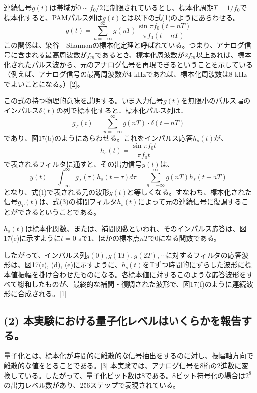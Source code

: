 \documentclass[
  a4paper,
  11pt,
]{ltjsarticle}
\begin{document}
連続信号$g(t)$は帯域が$0 \sim f_0/2$に制限されているとし、標本化周期$T = 1/f_0$で標本化すると、PAMパルス列は$g(t)$とは以下の式(1)のようにあらわせる。
\begin{equation}
  g(t) = \sum_{n=-\infty}^{\infty} g(nT) \frac{\sin \pi f_0(t - nT)}{\pi f_0 (t - nT)} \label{eq:1}
\end{equation}
この関係は、染谷―Shannonの標本化定理と呼ばれている。つまり、アナログ信号に含まれる最高周波数が$f_m$であるとき、標本化周波数が$2f_m$以上あれば、標本化されたパルス波から、元のアナログ信号を再現できるということを示している（例えば、アナログ信号の最高周波数が4 \si{\kilo\hertz}であれば、標本化周波数は8 \si{\kilo\hertz}でよいことになる。）[2]。

この式の持つ物理的意味を説明する。いま入力信号$g(t)$を無限小のパルス幅のインパルス$\delta(t)$の列で標本化すると、標本化パルス列は、
\begin{equation}
  g_T(t) = \sum_{n=-\infty}^{\infty} g(nT) \cdot \delta(t - nT) \label{eq:2}
\end{equation}
であり、図17(b)のようにあらわせる。これをインパルス応答$h_s(t)$が、
\begin{equation}
  h_s(t) = \frac{\sin \pi f_0 t}{\pi f_0 t} \label{eq:3}
\end{equation}
で表されるフィルタに通すと、その出力信号$y(t)$は、
\begin{equation}
  y(t) = \int_{-\infty}^{\infty} g_T(\tau) h_s(t-\tau)d\tau = \sum_{n=-\infty}^{\infty} g(nT) h_s(t - nT) \label{eq:4}
\end{equation}
となり、式(1)で表される元の波形$g(t)$と等しくなる。すなわち、標本化された信号$g_T(t)$は、式(3)の補間フィルタ$h_s(t)$によって元の連続信号に復調することができるということである。

$h_s(t)$は標本化関数、または、補間関数といわれ、そのインパルス応答は、図17(c)に示すように$t = 0$ \si{\second}で1、ほかの標本点$nT$で0になる関数である。

したがって、インパルス列$g(0), g(1T), g(2T), \cdots$に対するフィルタの応答波形は、図17(c), (d), (e)に示すように、$h_s(t)$をTずつ時間的にずらした波形に標本値振幅を掛け合わせたものになる。各標本値に対するこのような応答波形をすべて総和したものが、最終的な補間・復調された波形で、図17(f)のように連続波形に合成される。[1]

\subsection{(2) 本実験における量子化レベルはいくらかを報告する。}
量子化とは、標本化が時間的に離散的な信号抽出をするのに対し、振幅軸方向で離散的な値をとることである。[3]
本実験では、アナログ信号を8桁の2進数に変換している。したがって、量子化ビット数は8である。8ビット符号化の場合は$2^8$の出力レベル数があり、256ステップで表現されている。
\end{document}
